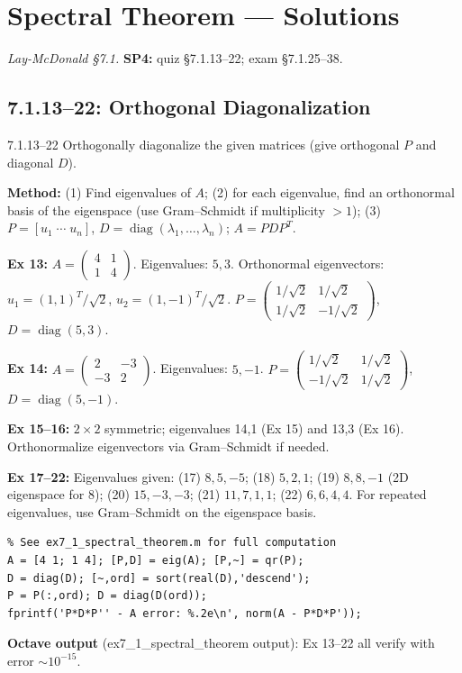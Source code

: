 \chapter{Spectral Theorem --- Solutions}

\noindent\textit{Lay-McDonald \S7.1.} \textbf{SP4:} quiz \S7.1.13--22; exam \S7.1.25--38.

\section*{7.1.13--22: Orthogonal Diagonalization}

\begin{exercise}{7.1.13--22}
Orthogonally diagonalize the given matrices (give orthogonal $P$ and diagonal $D$).
\end{exercise}
\begin{solution}
\textbf{Method:} (1) Find eigenvalues of $A$; (2) for each eigenvalue, find an orthonormal basis of the eigenspace (use Gram--Schmidt if multiplicity $>1$); (3) $P=[u_1\;\cdots\;u_n]$, $D=\operatorname{diag}(\lambda_1,\ldots,\lambda_n)$; $A=PDP^T$.

\textbf{Ex 13:} $A=\begin{pmatrix}4&1\\1&4\end{pmatrix}$. Eigenvalues: $5,3$. Orthonormal eigenvectors: $u_1=(1,1)^T/\sqrt{2}$, $u_2=(1,-1)^T/\sqrt{2}$. $P=\begin{pmatrix}1/\sqrt{2}&1/\sqrt{2}\\1/\sqrt{2}&-1/\sqrt{2}\end{pmatrix}$, $D=\operatorname{diag}(5,3)$.

\textbf{Ex 14:} $A=\begin{pmatrix}2&-3\\-3&2\end{pmatrix}$. Eigenvalues: $5,-1$. $P=\begin{pmatrix}1/\sqrt{2}&1/\sqrt{2}\\-1/\sqrt{2}&1/\sqrt{2}\end{pmatrix}$, $D=\operatorname{diag}(5,-1)$.

\textbf{Ex 15--16:} $2\times2$ symmetric; eigenvalues 14,1 (Ex 15) and 13,3 (Ex 16). Orthonormalize eigenvectors via Gram--Schmidt if needed.

\textbf{Ex 17--22:} Eigenvalues given: (17) $8,5,-5$; (18) $5,2,1$; (19) $8,8,-1$ (2D eigenspace for 8); (20) $15,-3,-3$; (21) $11,7,1,1$; (22) $6,6,4,4$. For repeated eigenvalues, use Gram--Schmidt on the eigenspace basis.
\begin{lstlisting}
% See ex7_1_spectral_theorem.m for full computation
A = [4 1; 1 4]; [P,D] = eig(A); [P,~] = qr(P);
D = diag(D); [~,ord] = sort(real(D),'descend');
P = P(:,ord); D = diag(D(ord));
fprintf('P*D*P'' - A error: %.2e\n', norm(A - P*D*P'));
\end{lstlisting}
\textbf{Octave output} (ex7\_1\_spectral\_theorem output): Ex 13--22 all verify with error $\sim10^{-15}$.
\end{solution}

